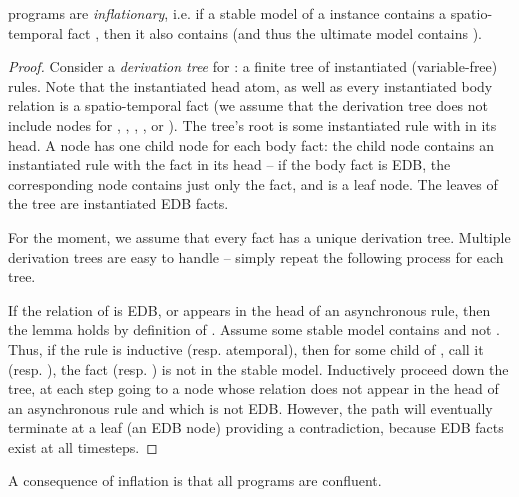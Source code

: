 \begin{lemma}
\label{lem:inflationary}
\slang programs are {\em inflationary}, i.e. if a stable model of a \slang instance contains a spatio-temporal fact , then it also contains  (and thus the ultimate model contains ).
\end{lemma}
\begin{proof}
Consider a {\em derivation tree} for : a finite tree of instantiated (variable-free) rules.  Note that the instantiated head atom, as well as every instantiated body relation is a spatio-temporal fact (we assume that the derivation tree does not include nodes for , , , \dedalus{<}, or ).  The tree's root is some instantiated rule with  in its head.  A node has one child node for each body fact: the child node contains an instantiated rule with the fact in its head -- if the body fact is EDB, the corresponding node contains just only the fact, and is a leaf node.  The leaves of the tree are instantiated EDB facts.

For the moment, we assume that every fact has a unique derivation tree.  Multiple derivation trees are easy to handle -- simply repeat the following process for each tree.

If the relation of  is EDB, or appears in the head of an asynchronous rule, then the lemma holds by definition of \slang.  Assume some stable model contains  and not .  Thus, if the rule is inductive (resp. atemporal), then for some child of , call it  (resp. ), the fact  (resp. ) is not in the stable model.  Inductively proceed down the tree, at each step going to a node whose relation does not appear in the head of an asynchronous rule and which is not EDB.  However, the path will eventually terminate at a leaf (an EDB node) providing a contradiction, because EDB facts exist at all timesteps.
\end{proof}

A consequence of inflation is that all \slang programs are confluent.

